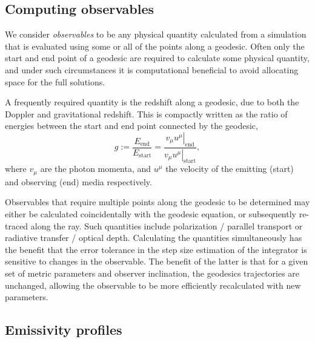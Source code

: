 \subsection{Computing observables}
\label{sec:computing-observables}

We consider \textit{observables} to be any physical quantity calculated from a simulation that is evaluated using some or all of the points along a geodesic. Often only the start and end point of a geodesic are required to calculate some physical quantity, and under such circumstances it is computational beneficial to avoid allocating space for the full solutions.

A frequently required quantity is the redshift along a geodesic, due to both the Doppler and gravitational redshift. This is compactly written as the ratio of energies between the start and end point connected by the geodesic,
\begin{equation}
\label{eq:redshift}
g := \frac{E_\text{end}}{E_\text{start}} = \frac{\left. v_\mu u^\mu \right\rvert_\text{end}}{\left. v_\mu u^\mu \right\rvert_{\text{start}}},
\end{equation}
where $v_\mu$ are the photon momenta, and $u^\mu$ the velocity of the emitting (start) and observing (end) media respectively.

Observables that require multiple points along the geodesic to be determined may either be calculated coincidentally with the geodesic equation, or subsequently re-traced along the ray. Such quantities include polarization / parallel transport or radiative transfer / optical depth. Calculating the quantities simultaneously has the benefit that the error tolerance in the step size estimation of the integrator is sensitive to changes in the observable. The benefit of the latter is that for a given set of metric parameters and observer inclination, the geodesics trajectories are unchanged, allowing the observable to be more efficiently recalculated with new parameters.


\subsection{Emissivity profiles}
\label{sec:emissivity-profiles}

